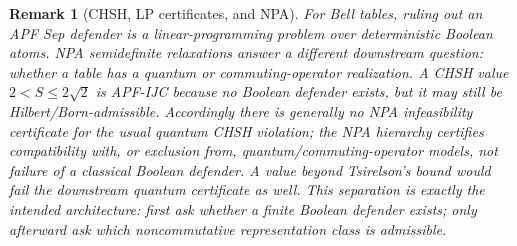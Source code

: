 \documentclass[11pt]{article}
\newtheorem{remark}[theorem]{Remark}
\begin{document}
\begin{remark}[CHSH, LP certificates, and NPA]\label{rem:chsh-lp-npa}
For Bell tables, ruling out an APF Sep defender is a linear-programming problem over deterministic Boolean atoms.  NPA semidefinite relaxations answer a different downstream question: whether a table has a quantum or commuting-operator realization.  A CHSH value $2<S\le2\sqrt2$ is APF-IJC because no Boolean defender exists, but it may still be Hilbert/Born-admissible.  Accordingly there is generally no NPA infeasibility certificate for the usual quantum CHSH violation; the NPA hierarchy certifies compatibility with, or exclusion from, quantum/commuting-operator models, not failure of a classical Boolean defender.  A value beyond Tsirelson's bound would fail the downstream quantum certificate as well.  This separation is exactly the intended architecture: first ask whether a finite Boolean defender exists; only afterward ask which noncommutative representation class is admissible.
\end{remark}
\end{document}
